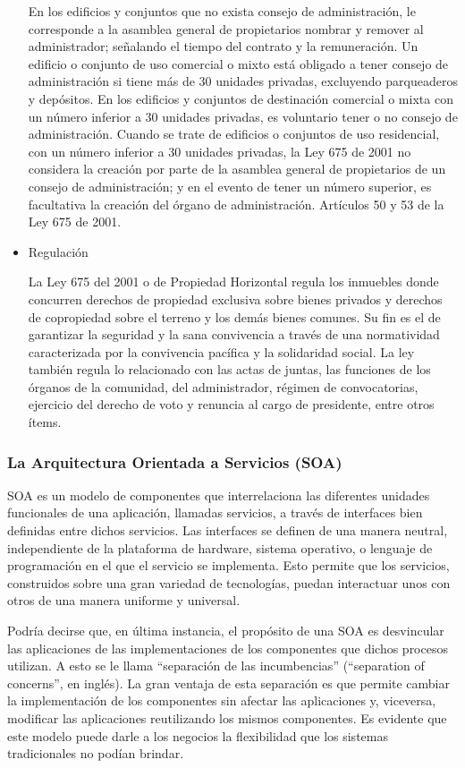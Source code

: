 \begin{itemize}
En los edificios y conjuntos que no exista consejo de administración, le corresponde a la asamblea general de propietarios nombrar y remover al administrador; señalando el tiempo del contrato y la remuneración. Un edificio o conjunto de uso comercial o mixto está obligado a tener consejo de administración si tiene más de 30 unidades privadas, excluyendo parqueaderos y depósitos. En los edificios y conjuntos de destinación comercial o mixta con un número inferior a 30 unidades privadas, es voluntario tener o no consejo de administración.
Cuando se trate de edificios o conjuntos de uso residencial, con un número inferior a 30 unidades privadas, la Ley 675 de 2001 no considera la creación por parte de la asamblea general de propietarios de un consejo de administración; y en el evento de tener un número superior, es facultativa la creación del órgano de administración. Artículos 50 y 53 de la Ley 675 de 2001.\cite{WEB2}

\item	Regulación

La Ley 675 del 2001 o de Propiedad Horizontal regula los inmuebles donde concurren derechos de propiedad exclusiva sobre bienes privados y derechos de copropiedad sobre el terreno y los demás bienes comunes. Su fin es el de garantizar la seguridad y la sana convivencia a través de una normatividad caracterizada por la convivencia pacífica y la solidaridad social.
La ley también regula lo relacionado con las actas de juntas, las funciones de los órganos de la comunidad, del administrador, régimen de convocatorias, ejercicio del derecho de voto y renuncia al cargo de presidente, entre otros ítems.\cite{WEB3} 
\end{itemize}

\subsubsection{La Arquitectura Orientada a Servicios (SOA)}

SOA es un modelo de componentes que interrelaciona las diferentes unidades funcionales de una aplicación, llamadas servicios, a través de interfaces bien definidas entre dichos servicios. Las interfaces se definen de una manera neutral, independiente de la plataforma de hardware, sistema operativo, o lenguaje de programación en el que el servicio se implementa. Esto permite que los servicios, construidos sobre una gran variedad de tecnologías, puedan interactuar unos con otros de una manera uniforme y universal.

Podría decirse que, en última instancia, el propósito de una SOA es desvincular las aplicaciones de las implementaciones de los componentes que dichos procesos utilizan. A esto se le llama “separación de las incumbencias” (“separation of concerns”, en inglés). La gran ventaja de esta separación es que permite cambiar la implementación de los componentes sin afectar las aplicaciones y, viceversa, modificar las aplicaciones reutilizando los mismos componentes. Es evidente que este modelo puede darle a los negocios la flexibilidad que los sistemas tradicionales no podían brindar.

